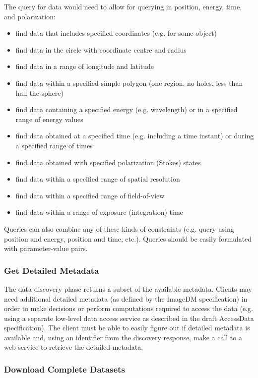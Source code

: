 \documentclass[11pt,a4paper]{ivoa}
\begin{document}
The query for data would need to allow for querying in position, energy, time, and polarization:
\begin{itemize}
    \item find data that includes specified coordinates (e.g. for some object)
    \item find data in the circle with coordinate centre and radius
    \item find data in a range of longitude and latitude
    \item find data within a specified simple  polygon (one region, no holes, less than half the sphere)
    \item find data containing a specified energy (e.g. wavelength) or in a specified range of energy values
    \item find data obtained at a specified time (e.g. including a time instant) or during a specified range of times
    \item find data obtained with specified polarization (Stokes) states
    \item find data within a specified range of spatial resolution
    \item find data within a specified range of field-of-view
    \item find data within a range of exposure (integration) time
\end{itemize}
Queries can also combine any of these kinds of constraints (e.g. query using
position and energy, position and time, etc.). Queries should be easily formulated with parameter-value pairs.

\subsubsection{Get Detailed Metadata}
The data discovery phase returns a subset of the available metadata.  Clients may need additional detailed metadata (as defined by the ImageDM specification) in order to make decisions or perform computations required to access the data (e.g. using a separate low-level data access service as described in the draft AccessData specification). The client must be able to easily figure out if detailed metadata is available and, using an identifier from the discovery response, make a call to a web service to retrieve the detailed metadata.

\subsubsection{Download Complete Datasets}
\label{sec:sync}
\end{document}
